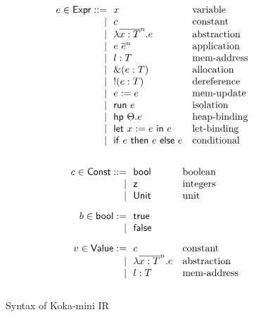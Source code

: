 \begin{figure}[H]
		\small
		\begin{minipage}[t]{.55\columnwidth}
			\[\begin{array}{@{}r@{\ \ }l@{\quad}l}
				e  \in \expr ::= & x                          & \mbox{variable}\\
				               \mid & c     			    & \mbox{constant} \\
				              \mid & \abs x T n e           & \mbox{abstraction}\\
				              \mid & \app e e n              & \mbox{application} \\
				              \mid & \addr l T                 & \mbox{mem-address}\\
				              \mid & \alloc e T               & \mbox{allocation} \\
				              \mid & \deref e T              & \mbox{dereference} \\
				              \mid & \eass e e              & \mbox{mem-update}\\ 
				              \mid & \run e                   & \mbox{isolation}\\
				              \mid & \hpe \kheap e              & \mbox{heap-binding}\\
				              \mid & \elet x e e            & \mbox{let-binding} \\
				              \mid & \cond e e e         & \mbox{conditional} \\ [2ex]
			\end{array}\]
		\end{minipage}%
		\begin{minipage}[t]{.70\columnwidth}
			\[\begin{array}{r@{\ \ }l@{\quad}l}
				c \in \const ::= & \kw{bool} & \mbox{boolean}\\
				               \mid & \kw{z}   & \mbox{integers}\\
				               \mid & \kunit & \mbox{unit}\\[2ex]
				b \in \kw{bool} := & \kw{true} \\
				      \mid & \kw{false}       \\[2ex]
				v \in \val := & c                     & \mbox{constant}\\
				           \mid & \abs x T n e    & \mbox{abstraction}\\
				           \mid & \addr l T          & \mbox{mem-address}\\[2ex]
				
			\end{array}\]
		\end{minipage}
		
	\caption{Syntax of Koka-mini IR}\label{fig:koka-mini-IR}
\end{figure}



